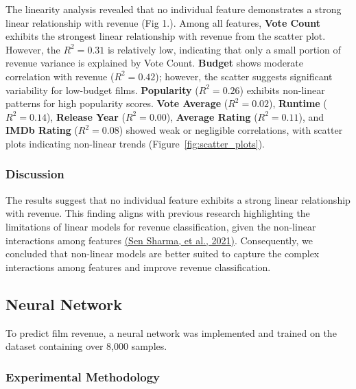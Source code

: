 \documentclass{article}
\begin{document}
The linearity analysis revealed that no individual feature demonstrates a strong linear relationship with revenue (Fig 1.). Among all features, \textbf{Vote Count} exhibits the strongest linear relationship with revenue from the scatter plot. However, the \( R^2 = 0.31 \) is relatively low, indicating that only a small portion of revenue variance is explained by Vote Count. \textbf{Budget} shows moderate correlation with revenue (\( R^2 = 0.42 \)); however, the scatter suggests significant variability for low-budget films. \textbf{Popularity} (\( R^2 = 0.26 \)) exhibits non-linear patterns for high popularity scores. \textbf{Vote Average} (\( R^2 = 0.02 \)), \textbf{Runtime} (\( R^2 = 0.14 \)), \textbf{Release Year} (\( R^2 = 0.00 \)), \textbf{Average Rating} (\( R^2 = 0.11 \)), and \textbf{IMDb Rating} (\( R^2 = 0.08 \)) showed weak or negligible correlations, with scatter plots indicating non-linear trends (Figure~\ref{fig:scatter_plots}).

\subsubsection{Discussion}
The results suggest that no individual feature exhibits a strong linear relationship with revenue. This finding aligns with previous research highlighting the limitations of linear models for revenue classification, given the non-linear interactions among features \hyperref[SenSharma2021]{(Sen Sharma, et al., 2021)}. Consequently, we concluded that non-linear models are better suited to capture the complex interactions among features and improve revenue classification.
\subsection{Neural Network}
To predict film revenue, a neural network was implemented and trained on the dataset containing over 8,000 samples. 

\subsubsection{Experimental Methodology}
\end{document}
